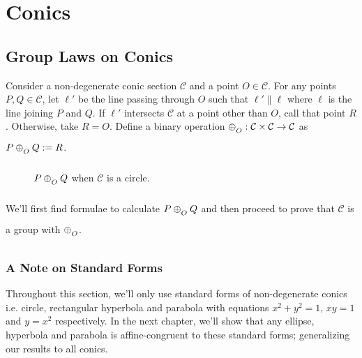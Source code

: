 \chapter{Conics}

\section{Group Laws on Conics}

Consider a non-degenerate conic section $\mathcal{C}$ and a point $O \in
\mathcal{C}$. For any points $P,Q\in\mathcal{C}$, let $\ell'$ be the line passing
through $O$ such that $\ell' \parallel \ell$ where $\ell$ is the line joining $P$
and $Q$. If $\ell'$ intersects $\mathcal{C}$ at a point other than $O$, call that
point $R$. Otherwise, take $R=O$. Define a binary operation
$\conop : \mathcal{C} \times \mathcal{C} \to \mathcal{C}$ as $P \conop Q := R$.
\vspace{1ex}

\begin{figure}[H]
    \center

    \caption{$P \conop Q$ when $\mathcal{C}$ is a circle.}
\end{figure}

We'll first find formulae to calculate $P \conop Q$ and then proceed to prove
that $\mathcal{C}$ is a group with $\conop$.
\subsection*{A Note on Standard Forms}

Throughout this section, we'll only use standard forms of non-degenerate conics
i.e. circle, rectangular hyperbola and parabola with equations $x^2+y^2=1$, $xy=1$
and $y=x^2$ respectively. In the next chapter, we'll show that any ellipse,
hyperbola and parabola is affine-congruent to these standard forms; generalizing
our results to all conics.

